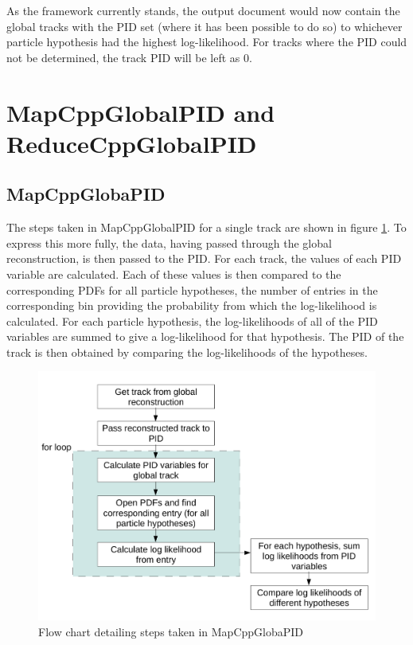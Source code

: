 \documentclass[a4paper,12pt]{article}
\begin{document}
As the framework currently stands, the output document would now contain the global tracks with the PID set (where it has been possible to do so) to whichever particle hypothesis had the highest log-likelihood. For tracks where the PID could not be determined, the track PID will be left as 0.

\section{MapCppGlobalPID and ReduceCppGlobalPID}
\label{mapred}
\subsection{MapCppGlobaPID}
\label{map}
The steps taken in MapCppGlobalPID for a single track are shown in 
figure \ref{mapflow}. To express this more fully, the data, having passed through the global reconstruction, is then passed to the PID. For each track, the values of each PID variable are calculated. Each of these values is then compared to the corresponding PDFs for all particle hypotheses, the number of entries in the corresponding bin providing the probability from which the log-likelihood is calculated. For each particle hypothesis, the log-likelihoods of all of the PID variables are summed to give a log-likelihood for that hypothesis. The PID of the track is then obtained by comparing the log-likelihoods of the hypotheses.
\begin{figure}[h!]
\begin{center} 
\includegraphics[width=5in]{PIDflow.pdf} 
\caption{Flow chart detailing steps taken in MapCppGlobaPID}
\label{mapflow}
\end{center} 
\end{figure}
\end{document}
